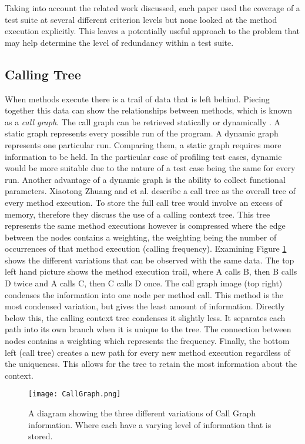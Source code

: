 Taking into account the related work discussed, each paper used the coverage of a test suite at several different criterion levels but none looked at the method execution explicitly. This leaves a potentially useful approach to the problem that may help determine the level of redundancy within a test suite. 
\subsection{Calling Tree}
When methods execute there is a trail of data that is left behind. Piecing together this data can show the relationships between methods, which is known as a \textit{call graph}. The call graph can be retrieved statically or dynamically \cite{graham1982gprof}. A static graph represents every possible run of the program. A dynamic graph represents one particular run. Comparing them, a static graph requires more information to be held. In the particular case of profiling test cases, dynamic would be more suitable due to the nature of a test case being the same for every run. Another advantage of a dynamic graph is the ability to collect functional parameters. Xiaotong Zhuang and et al. \cite{Zhuang06accurate} describe a call tree as the overall tree of every method execution. To store the full call tree would involve an excess of memory, therefore they discuss the use of a calling context tree. This tree represents the same method executions however is compressed where the edge between the nodes contains a weighting, the weighting being the number of occurrences of that method execution (calling frequency). Examining Figure \ref{fig:callgraph} shows the different variations that can be observed with the same data. The top left hand picture shows the method execution trail, where A calls B, then B calls D twice and A calls C, then C calls D once. The call graph image (top right) condenses the information into one node per method call. This method is the most condensed variation, but gives the least amount of information. Directly below this, the calling context tree condenses it slightly less. It separates each path into its own branch when it is unique to the tree. The connection between nodes contains a weighting which represents the frequency. Finally, the bottom left (call tree) creates a new path for every new method execution regardless of the uniqueness. This allows for the tree to retain the most information about the context.

\begin{figure}[h]
\begin{center}
\texttt{[image: CallGraph.png]}
\end{center}
\caption{A diagram showing the three different variations of Call Graph information. Where  each have a varying level of information that is stored.}
\label{fig:callgraph}
\end{figure}

